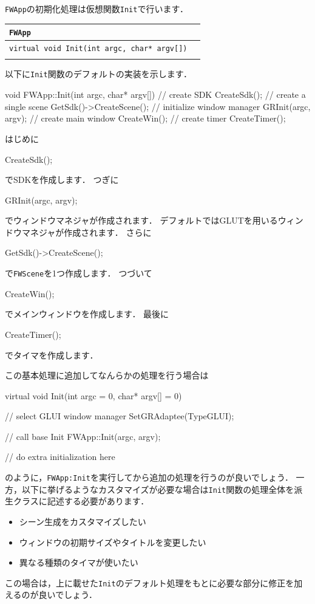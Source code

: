 \texttt{FWApp}の初期化処理は仮想関数\texttt{Init}で行います．

\noindent
\begin{tabular}{p{.7\hsize}p{.2\hsize}}
\\
\texttt{FWApp}											\\ \midrule
\texttt{virtual void Init(int argc, char* argv[])}	&	\\
\\
\end{tabular}

\KLUDGE 以下に\texttt{Init}関数のデフォルトの実装を示します．

\begin{sourcecode}
void FWApp::Init(int argc, char* argv[]){
    // create SDK
    CreateSdk();
    // create a single scene
    GetSdk()->CreateScene();
    // initialize window manager
    GRInit(argc, argv);
    // create main window
    CreateWin();
    // create timer
    CreateTimer();
}
\end{sourcecode}
\KLUDGE はじめに
\begin{sourcecode}
    CreateSdk();
\end{sourcecode}
\KLUDGE でSDKを作成します．
\KLUDGE つぎに
\begin{sourcecode}
    GRInit(argc, argv);
\end{sourcecode}
\KLUDGE でウィンドウマネジャが作成されます．
\KLUDGE デフォルトではGLUTを用いるウィンドウマネジャが作成されます．
\KLUDGE さらに
\begin{sourcecode}
    GetSdk()->CreateScene();
\end{sourcecode}
\KLUDGE で\texttt{FWScene}を1つ作成します．
\KLUDGE つづいて
\begin{sourcecode}
    CreateWin();
\end{sourcecode}
\KLUDGE でメインウィンドウを作成します．
\KLUDGE 最後に
\begin{sourcecode}
    CreateTimer();
\end{sourcecode}
\KLUDGE でタイマを作成します．

\KLUDGE この基本処理に追加してなんらかの処理を行う場合は
\begin{sourcecode}
virtual void Init(int argc = 0, char* argv[] = 0){
    // select GLUI window manager
    SetGRAdaptee(TypeGLUI);

    // call base Init
    FWApp::Init(argc, argv);

    // do extra initialization here


}
\end{sourcecode}
\KLUDGE のように，\texttt{FWApp:Init}を実行してから追加の処理を行うのが良いでしょう．
\KLUDGE 一方，以下に挙げるようなカスタマイズが必要な場合は\texttt{Init}関数の処理全体を派生クラスに記述する必要があります．
\begin{itemize}
\item シーン生成をカスタマイズしたい
\item ウィンドウの初期サイズやタイトルを変更したい
\item 異なる種類のタイマが使いたい
\end{itemize}
\KLUDGE この場合は，上に載せた\texttt{Init}のデフォルト処理をもとに必要な部分に修正を加えるのが良いでしょう．

